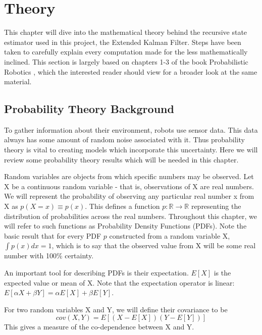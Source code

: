 \newcommand{\bel}{\mathrm{bel}}

\chapter{Theory}

This chapter will dive into the mathematical theory behind the recursive state estimator used in this project, the Extended Kalman Filter. Steps have been taken to carefully explain every computation made for the less mathematically inclined. This section is largely based on chapters 1-3 of the book Probabilistic Robotics \cite{probabilisticRobotics}, which the interested reader should view for a broader look at the same material. 

\section{Probability Theory Background} \label{sectionProbTheory}
To gather information about their environment, robots use sensor data. This data always has some amount of random noise associated with it. Thus probability theory is vital to creating models which incorporate  this uncertainty. Here we will review some probability theory results which will be needed in this chapter.

Random variables are objects from which specific numbers may be observed. Let X be a continuous random variable - that is, observations of X are real numbers. We will represent the probability of observing any particular real number x from X as \( p(X = x) \equiv p(x)\). This defines a function \(p: \mathbb{R} \to \mathbb{R}\) representing the distribution of probabilities across the real numbers. Throughout this chapter, we will refer to such functions as Probability Density Functions (PDFs). Note the basic result that for every PDF \(p\) constructed from a random variable X, \(\int p(x)dx = 1\), which is to say that the observed value from X will be some real number with 100\% certainty.

An important tool for describing PDFs is their expectation. \(E[X]\) is the expected value or mean of X. Note that the expectation operator is linear: \(E[\alpha X + \beta Y] = \alpha E[X] + \beta E[Y]\).

For two random variables X and Y, we will define their covariance to be
\[
cov(X,Y) = E[(X - E[X])(Y - E[Y])]
\] This gives a measure of the co-dependence between X and Y.

